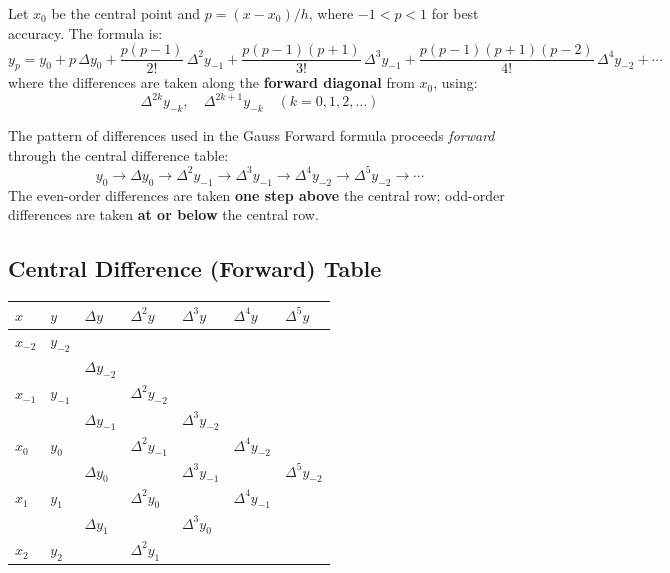 \documentclass[12pt]{article}
\newcommand{\hcell}[1]{\textbf{\color{white}#1}}
\begin{document}
\bigskip

\begin{defbox}
Let $x_0$ be the central point and $p = (x - x_0)/h$, where $-1 < p < 1$ for best accuracy. The formula is:
\[
  \boxed{y_p = y_0 + p\,\Delta y_0 + \frac{p(p-1)}{2!}\,\Delta^2 y_{-1} + \frac{p(p-1)(p+1)}{3!}\,\Delta^3 y_{-1} + \frac{p(p-1)(p+1)(p-2)}{4!}\,\Delta^4 y_{-2} + \cdots}
\]
where the differences are taken along the \textbf{forward diagonal} from $x_0$, using:
\[
  \Delta^{2k} y_{-k}, \quad \Delta^{2k+1} y_{-k} \quad (k = 0, 1, 2, \ldots)
\]
\end{defbox}

\bigskip

\begin{derivbox}
The pattern of differences used in the Gauss Forward formula proceeds \textit{forward} through the central difference table:
\[
  y_0 \to \Delta y_0 \to \Delta^2 y_{-1} \to \Delta^3 y_{-1} \to \Delta^4 y_{-2} \to \Delta^5 y_{-2} \to \cdots
\]
The even-order differences are taken \textbf{one step above} the central row; odd-order differences are taken \textbf{at or below} the central row.
\end{derivbox}

\bigskip

\subsection*{Central Difference (Forward) Table}

\begin{center}{\small
\begin{tabular}{C{1.8cm} C{1.5cm} C{2cm} C{2cm} C{2cm} C{2cm} C{2cm}}
\toprule
{}
\hcell{$x$} & \hcell{$y$} & \hcell{$\Delta y$} & \hcell{$\Delta^2 y$} & \hcell{$\Delta^3 y$} & \hcell{$\Delta^4 y$} & \hcell{$\Delta^5 y$} \\
\midrule
{}
$x_{-2}$ & $y_{-2}$ & & & & & \\
         &          & $\Delta y_{-2}$ & & & & \\
$x_{-1}$ & $y_{-1}$ & & $\Delta^2 y_{-2}$ & & & \\
         &          & $\Delta y_{-1}$ & & $\Delta^3 y_{-2}$ & & \\
$x_0$ & $y_0$ & & $\Delta^2 y_{-1}$ & & $\Delta^4 y_{-2}$ & \\
      &       & $\Delta y_0$ & & $\Delta^3 y_{-1}$ & & $\Delta^5 y_{-2}$ \\
$x_1$ & $y_1$ & & $\Delta^2 y_0$ & & $\Delta^4 y_{-1}$ & \\
      &       & $\Delta y_1$ & & $\Delta^3 y_0$ & & \\
$x_2$ & $y_2$ & & $\Delta^2 y_1$ & & & \\
\bottomrule
\end{tabular}
}\end{center}
\end{document}

